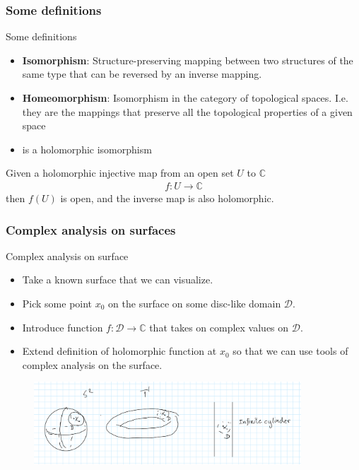 \documentclass{beamer}[10]
\begin{document}
\begin{frame}
	\frametitle{Some definitions}
	\begin{block}{Some definitions}
	\begin{itemize}
		\item \textbf{Isomorphism}: Structure-preserving mapping between two structures of the same type that can be reversed by an inverse mapping.
		\item \textbf{Homeomorphism}: Isomorphism in the category of topological spaces. I.e. they are the mappings that preserve all the topological properties of a given space
		\item  {} is a holomorphic isomorphism
	\end{itemize}
Given a holomorphic injective map from an open set $U$ to $\mathds{C}$
\begin{equation}
	\begin{aligned}
		f:U \to \mathds{C}
	\end{aligned}
\end{equation}
then $f(U)$ is open, and the inverse map is also holomorphic.
	\end{block}
\end{frame}

\begin{frame}
	\frametitle{Complex analysis on surfaces}
	\begin{block}{Complex analysis on surface}
		\begin{itemize}
			\item Take a known surface that we can visualize.
			\item Pick some point $x_0$ on the surface on some disc-like domain $\mathcal{D}$.
			\item Introduce function $f:\mathcal{D}\to \mathds{C}$ that takes on complex values on $\mathcal{D}$.
			\item Extend definition of holomorphic function at $x_0$ so that we can use tools of complex analysis on the surface.
		\end{itemize}
	\end{block}
\begin{figure}
	\includegraphics[width=10cm]{2.PNG}
\end{figure}
\end{frame}
\end{document}

